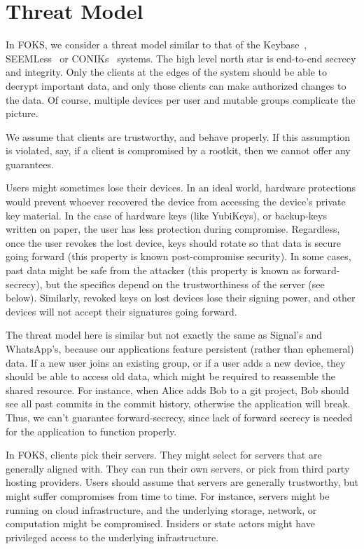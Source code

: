 
\section{Threat Model}
\label{sec:threatmodel}

In FOKS, we consider a threat model similar to that of the Keybase~\cite{keybase},
SEEMLess~\cite{chase2019seemless} or CONIKs~\cite{melara2015coniks} systems.
The high level north star is end-to-end secrecy and integrity. Only the clients
at the edges of the system should be able to decrypt important data, and only
those clients can make authorized changes to the data. Of course, multiple
devices per user and mutable groups complicate the picture.

We assume that clients are trustworthy, and behave properly. If this assumption
is violated, say, if a client is compromised by a rootkit, then we cannot
offer any guarantees. 

Users might sometimes lose their devices. In an ideal world, hardware protections
would prevent whoever recovered the device from accessing the device's private
key material. In the case of hardware keys (like YubiKeys), or backup-keys
written on paper, the user has less protection during compromise. Regardless,
once the user revokes the lost device, keys should rotate so that data is secure
going forward (this property is known post-compromise security). In some cases,
past data might be safe from the attacker (this property is known as forward-secrecy),
but the specifics depend on the trustworthiness of the server (see below). Similarly, revoked
keys on lost devices lose their signing power, and other devices will not accept
their signatures going forward.

The threat model here is similar but not exactly the same as Signal's and
WhatsApp's, because our applications feature persistent (rather than ephemeral)
data. If a new user joins an existing group, or if a user adds a new device,
they should be able to access old data, which might be required to reassemble the
shared resource. For instance, when Alice adds Bob to a git project, Bob
should see all past commits in the commit history, otherwise the
application will break. Thus, we can't guarantee forward-secrecy, since
lack of forward secrecy is needed for the application to function properly.

In FOKS, clients pick their servers. They might select for servers
that are generally aligned with. They can run their own servers, or pick 
from third party hosting providers. Users should assume that servers
are generally trustworthy, but might suffer compromises from time to time.
For instance, servers might be running on cloud infrastructure, and the underlying
storage, network, or computation might be compromised. Insiders or state actors
might have privileged access to the underlying infrastructure. 

